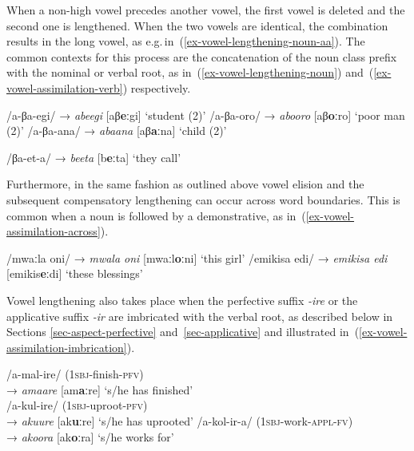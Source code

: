 When a non-high vowel precedes another vowel, the first vowel is deleted and the second one is lengthened. 
When the two vowels are identical, the combination results in the long vowel, as e.g.\,in~(\ref{ex-vowel-lengthening-noun-aa}). 
The common contexts for this process are the concatenation of the noun class prefix with the nominal or verbal root, as in~(\ref{ex-vowel-lengthening-noun}) and~(\ref{ex-vowel-assimilation-verb}) respectively. 

\ea \label{ex-vowel-lengthening-noun}
\begin{xlist}	
	\ex /a-βa-egi/	→	\textit{abeegi}      [aβ\textbf{eː}gi]	‘student (2)’  
	\ex /a-βa-oro/	→	\textit{abooro}    [aβ\textbf{oː}ro] ‘poor man (2)’
       \ex /a-βa-ana/	→	\textit{abaana}      [aβ\textbf{aː}na]	‘child (2)’  \label{ex-vowel-lengthening-noun-aa}
\end{xlist}	
\zlast
\clearpage

\ea \label{ex-vowel-assimilation-verb}
	/βa-et-a/	→	\textit{beeta} 	     [b\textbf{eː}ta]	‘they call’ 
\z

Furthermore, in the same fashion as outlined above vowel elision and the subsequent compensatory lengthening can occur across word boundaries. This is common when a noun is followed by a demonstrative, as in~(\ref{ex-vowel-assimilation-across}).

\ea \label{ex-vowel-assimilation-across}
\begin{xlist}	
	\ex /mwaːla oni/	→ \textit{mwala oni} 	     [mwaːl\textbf{oː}ni]	‘this girl’ 
	\ex /emikisa edi/	→	\textit{emikisa edi} 	     [emikis\textbf{eː}di]	‘these blessings'
\end{xlist}	
\z

Vowel lengthening also takes place when the perfective suffix  \textit{-ire} or the applicative suffix  \textit{-ir} are imbricated with the verbal root, as described below in Sections \ref{sec-aspect-perfective} and~\ref{sec-applicative} and illustrated in~(\ref{ex-vowel-assimilation-imbrication}).

\ea \label{ex-vowel-assimilation-imbrication}
\begin{xlist}	
	\ex /a-mal-ire/	(\textsc{1sbj}-finish-\textsc{pfv})\\→	 \textit{amaare} 	     [am\textbf{aː}re]	‘s/he has finished’\\
		/a-kul-ire/	(\textsc{1sbj}-uproot-\textsc{pfv})\\→	 \textit{akuure} 	     [ak\textbf{uː}re]	‘s/he has uprooted’ 
	\ex  /a-kol-ir-a/ 	(\textsc{1sbj}-work-\textsc{appl}-\textsc{fv})\\→  \textit{akoora}	 [ak\textbf{oː}ra] `s/he works for'
\end{xlist}	
\z

